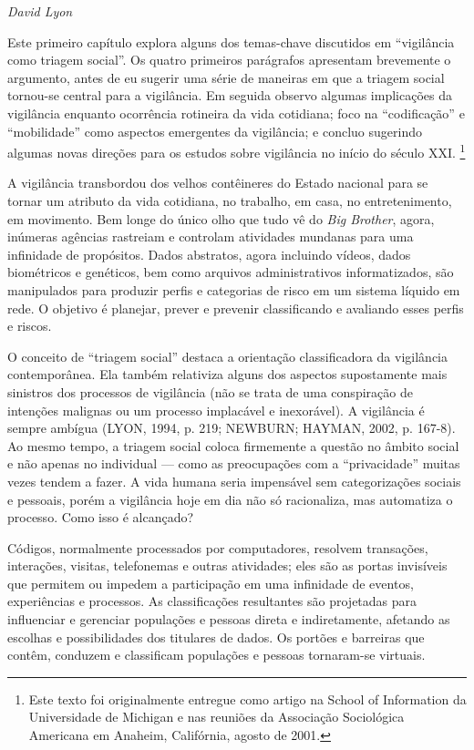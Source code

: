 \begin{flushright}
\emph{David Lyon}
\end{flushright}

Este primeiro capítulo explora alguns dos temas-chave discutidos em
``vigilância como triagem social''. Os quatro primeiros parágrafos
apresentam brevemente o argumento, antes de eu sugerir uma série de
maneiras em que a triagem social tornou-se central para a vigilância. Em
seguida observo algumas implicações da vigilância enquanto ocorrência
rotineira da vida cotidiana; foco na ``codificação'' e ``mobilidade''
como aspectos emergentes da vigilância; e concluo sugerindo algumas
novas direções para os estudos sobre vigilância no início do século XXI.
\footnote{Este texto foi originalmente entregue como artigo na School of
  Information da Universidade de Michigan e nas reuniões da Associação
  Sociológica Americana em Anaheim, Califórnia, agosto de 2001.}

A vigilância transbordou dos velhos contêineres do Estado nacional para
se tornar um atributo da vida cotidiana, no trabalho, em casa, no
entretenimento, em movimento. Bem longe do único olho que tudo vê do
\emph{Big Brother}, agora, inúmeras agências rastreiam e controlam
atividades mundanas para uma infinidade de propósitos. Dados abstratos,
agora incluindo vídeos, dados biométricos e genéticos, bem como arquivos
administrativos informatizados, são manipulados para produzir perfis e
categorias de risco em um sistema líquido em rede. O objetivo é
planejar, prever e prevenir classificando e avaliando esses perfis e
riscos.

O conceito de ``triagem social'' destaca a orientação classificadora da
vigilância contemporânea. Ela também relativiza alguns dos aspectos
supostamente mais sinistros dos processos de vigilância (não se trata de
uma conspiração de intenções malignas ou um processo implacável e
inexorável). A vigilância é sempre ambígua (LYON, 1994, p. 219; NEWBURN;
HAYMAN, 2002, p. 167-8). Ao mesmo tempo, a triagem social coloca
firmemente a questão no âmbito social e não apenas no individual ---
como as preocupações com a ``privacidade'' muitas vezes tendem a fazer.
A vida humana seria impensável sem categorizações sociais e pessoais,
porém a vigilância hoje em dia não só racionaliza, mas automatiza o
processo. Como isso é alcançado?

Códigos, normalmente processados por computadores, resolvem transações,
interações, visitas, telefonemas e outras atividades; eles são as portas
invisíveis que permitem ou impedem a participação em uma infinidade de
eventos, experiências e processos. As classificações resultantes são
projetadas para influenciar e gerenciar populações e pessoas direta e
indiretamente, afetando as escolhas e possibilidades dos titulares de
dados. Os portões e barreiras que contêm, conduzem e classificam
populações e pessoas tornaram-se virtuais.

